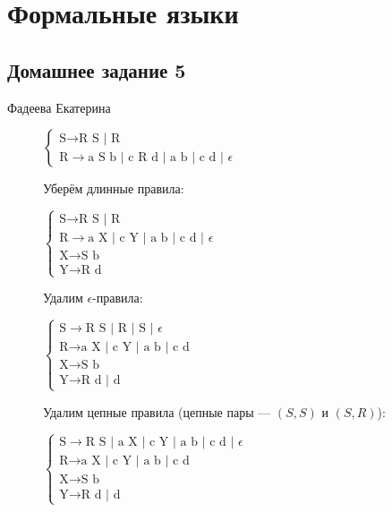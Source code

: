 \documentclass[12pt,a4paper]{scrartcl}
\begin{document}
	\section*{Формальные языки}
	\subsection*{Домашнее задание 5}
	\begin{flushright}
		Фадеева Екатерина
	\end{flushright}

\begin{description}
	\item[]
	$\begin{cases}
		\text{S} \rightarrow \text{R S | R}\\
		\text{R} \rightarrow \text{a S b | c R d | a b | c d | } \epsilon
	\end{cases}$

	Уберём длинные правила:
	
	$\begin{cases}
		\text{S} \rightarrow \text{R S | R}\\
		\text{R} \rightarrow \text{a X | c Y | a b | c d | } \epsilon\\
		\text{X} \rightarrow \text{S b}\\
		\text{Y} \rightarrow \text{R d}
	\end{cases}$
	
	Удалим $\epsilon$-правила:
	
	$\begin{cases}
		\text{S} \rightarrow \text{R S | R | S | } \epsilon\\
		\text{R} \rightarrow \text{a X | c Y | a b | c d}\\
		\text{X} \rightarrow \text{S b}\\
		\text{Y} \rightarrow \text{R d | d}
	\end{cases}$
	
	
	Удалим цепные правила (цепные пары --- $(S, S)$ и $(S, R)$):
	
	$\begin{cases}
		\text{S} \rightarrow \text{R S | a X | c Y | a b | c d | } \epsilon\\
		\text{R} \rightarrow \text{a X | c Y | a b | c d}\\
		\text{X} \rightarrow \text{S b}\\
		\text{Y} \rightarrow \text{R d | d}
	\end{cases}$	
		

\end{description}
\end{document}
